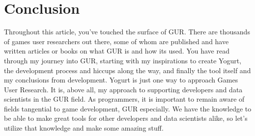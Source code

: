 \documentclass[journal]{IEEEtran}
\begin{document}
%






\section{Conclusion}
Throughout this article, you’ve touched the surface of GUR. There are thousands of games user researchers out there, some of whom are published and have written articles or books on what GUR is and how its used. You have read through my journey into GUR, starting with my inspirations to create Yogurt, the development process and hiccups along the way, and finally the tool itself and my conclusions from development. Yogurt is just one way to approach Games User Research. It is, above all, my approach to supporting developers and data scientists in the GUR field. As programmers, it is important to remain aware of fields tangential to game development, GUR especially. We have the knowledge to be able to make great tools for other developers and data scientists alike, so let’s utilize that knowledge and make some amazing stuff.
\end{document}

